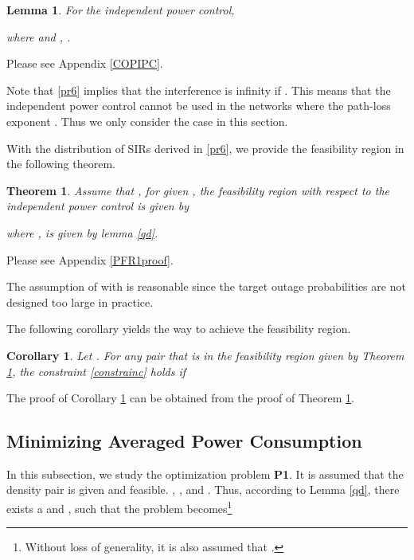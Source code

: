 \documentclass[12pt, draftclsnofoot, journal, letterpaper, onecolumn]{IEEEtran}
\newtheorem{lemma}{Lemma}[section]
\newtheorem{corollary}{Corollary}[section]
\newtheorem{theorem}{Theorem}[section]
\begin{document}
\begin{lemma}\label{OPLA}
For the independent power control,

where  and , .
\end{lemma}

\begin{IEEEproof}
  Please see Appendix \ref{COPIPC}.
\end{IEEEproof}

Note that \eqref{pr6} implies that the interference is infinity if . This means that the independent power control cannot be used in the networks where the path-loss exponent . Thus we only consider the case  in this section.


With the distribution of SIRs derived in \eqref{pr6}, we provide the feasibility region in the following theorem.




\begin{theorem}\label{PFR1t}
Assume that , for given , the feasibility region with respect to the independent power control is given by

where ,  is given by lemma \ref{qd}.
\end{theorem}

\begin{IEEEproof}
  Please see Appendix \ref{PFR1proof}.
\end{IEEEproof}
The assumption of  with  is reasonable since the target outage probabilities are not designed too large in practice.

The following corollary yields the way to achieve the feasibility region.
\begin{corollary}\label{PFR1tC}
Let . For any pair  that is in the feasibility region given by Theorem \ref{PFR1t}, the constraint \eqref{constrainc} holds if

\end{corollary}
The proof of Corollary \ref{PFR1tC} can be obtained from the proof of Theorem \ref{PFR1t}.




\subsection{Minimizing Averaged Power Consumption}

In this subsection, we study the optimization problem \textbf{P1}. It is assumed that the density pair  is given and feasible. , , and . Thus, according to Lemma \ref{qd}, there exists a  and , such that the problem becomes\footnote{Without loss of generality, it is also assumed that .}
\end{document}
